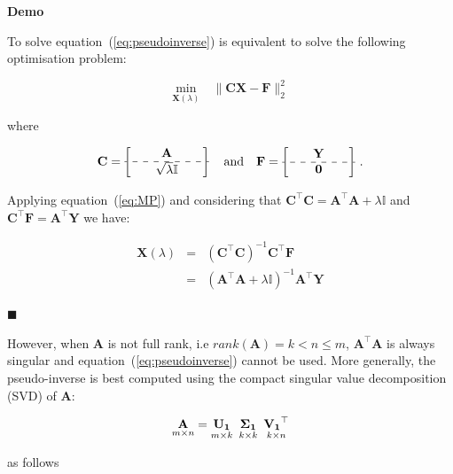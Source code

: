 \textbf{Demo}\quad

To solve equation~(\ref{eq:pseudoinverse}) is equivalent to solve the following
optimisation problem:


\begin{equation}
\label{eq:RRproblem2}
\underset{\mathbf{X}(\lambda)}{\text{min}} \quad \|
\mathbf{C}\mathbf{\mathbf{X}} - \mathbf{F} \|_2^2
\end{equation}

\noindent where

\begin{equation*}
	\mathbf{C}=
	\begin{bmatrix} \quad &\mathbf{A}& \quad \\ \hdashline \quad
& \sqrt\lambda\mathbb{I}&\quad  
\end{bmatrix} 
\quad \text{and} \quad
	\mathbf{F}=\begin{bmatrix} \quad &\mathbf{Y}& \quad \\ \hdashline \quad
& \mathbf{0}&\quad  \end{bmatrix} \, .
\end{equation*}

Applying equation~(\ref{eq:MP}) and considering that $\mathbf{C}^\top
\mathbf{C} = \mathbf{A}^\top \mathbf{A} + \lambda \mathbb{I}$ and 
$\mathbf{C}^\top \mathbf{F}=\mathbf{A}^\top \mathbf{Y} $ we have:

\begin{eqnarray*}
\mathbf{X}(\lambda)&=&(\mathbf{C}^\top
\mathbf{C})^{-1}\mathbf{C}^\top \mathbf{F} \\
&=& (\mathbf{A}^\top \mathbf{A} + \lambda \mathbb{I})^{-1} \mathbf{A}^\top \mathbf{Y}
\end{eqnarray*}

$\blacksquare$


However, when $\mathbf{A}$ is not full rank, i.e
$rank(\mathbf{A})=k <  n \leq m$, $\mathbf{A}^\top \mathbf{A}$ is
always singular and equation~(\ref{eq:pseudoinverse}) cannot be used.
More generally, the pseudo-inverse is best computed using the compact
singular value decomposition (SVD) of $\mathbf{A}$:

\begin{equation}
    \label{eq:compactsvd}
    \underset{m \times n}{\mathbf{A}}=
    \underset{m \times k}{\mathbf{U_1}} \enskip
    \underset{k \times k}{\mathbf{\Sigma_1}} \enskip
    \underset{k \times n}{\mathbf{V_1}^\top}
\end{equation}

\noindent as follows

